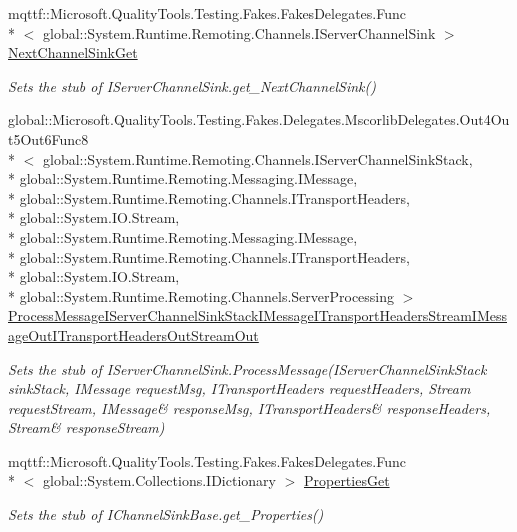 \begin{DoxyCompactItemize}
mqttf\-::\-Microsoft.\-Quality\-Tools.\-Testing.\-Fakes.\-Fakes\-Delegates.\-Func\\*
$<$ global\-::\-System.\-Runtime.\-Remoting.\-Channels.\-I\-Server\-Channel\-Sink $>$ \hyperlink{class_system_1_1_runtime_1_1_remoting_1_1_channels_1_1_fakes_1_1_stub_i_server_channel_sink_a40df6d5a224adcde8ae068d8e1484b47}{Next\-Channel\-Sink\-Get}
\begin{DoxyCompactList}\small\item\em Sets the stub of I\-Server\-Channel\-Sink.\-get\-\_\-\-Next\-Channel\-Sink()\end{DoxyCompactList}\item 
global\-::\-Microsoft.\-Quality\-Tools.\-Testing.\-Fakes.\-Delegates.\-Mscorlib\-Delegates.\-Out4\-Out5\-Out6\-Func8\\*
$<$ global\-::\-System.\-Runtime.\-Remoting.\-Channels.\-I\-Server\-Channel\-Sink\-Stack, \\*
global\-::\-System.\-Runtime.\-Remoting.\-Messaging.\-I\-Message, \\*
global\-::\-System.\-Runtime.\-Remoting.\-Channels.\-I\-Transport\-Headers, \\*
global\-::\-System.\-I\-O.\-Stream, \\*
global\-::\-System.\-Runtime.\-Remoting.\-Messaging.\-I\-Message, \\*
global\-::\-System.\-Runtime.\-Remoting.\-Channels.\-I\-Transport\-Headers, \\*
global\-::\-System.\-I\-O.\-Stream, \\*
global\-::\-System.\-Runtime.\-Remoting.\-Channels.\-Server\-Processing $>$ \hyperlink{class_system_1_1_runtime_1_1_remoting_1_1_channels_1_1_fakes_1_1_stub_i_server_channel_sink_a5fb09d80d67a19de42626b108e3e964b}{Process\-Message\-I\-Server\-Channel\-Sink\-Stack\-I\-Message\-I\-Transport\-Headers\-Stream\-I\-Message\-Out\-I\-Transport\-Headers\-Out\-Stream\-Out}
\begin{DoxyCompactList}\small\item\em Sets the stub of I\-Server\-Channel\-Sink.\-Process\-Message(I\-Server\-Channel\-Sink\-Stack sink\-Stack, I\-Message request\-Msg, I\-Transport\-Headers request\-Headers, Stream request\-Stream, I\-Message\& response\-Msg, I\-Transport\-Headers\& response\-Headers, Stream\& response\-Stream)\end{DoxyCompactList}\item 
mqttf\-::\-Microsoft.\-Quality\-Tools.\-Testing.\-Fakes.\-Fakes\-Delegates.\-Func\\*
$<$ global\-::\-System.\-Collections.\-I\-Dictionary $>$ \hyperlink{class_system_1_1_runtime_1_1_remoting_1_1_channels_1_1_fakes_1_1_stub_i_server_channel_sink_a8a1593c39e010de30d467ebf26b882e7}{Properties\-Get}
\begin{DoxyCompactList}\small\item\em Sets the stub of I\-Channel\-Sink\-Base.\-get\-\_\-\-Properties()\end{DoxyCompactList}\end{DoxyCompactItemize}


